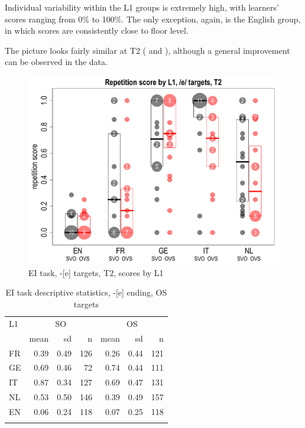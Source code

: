 Individual variability within the L1 groups is extremely high, with learners’ scores ranging from 0\% to 100\%. The only exception, again, is the English group, in which scores are consistently close to floor level.

The picture looks fairly similar at T2 ( and ), although a general improvement can be observed in the data. 

\begin{figure}
    \includegraphics[width=\textwidth]{figures/04-2.pdf}
    \caption{EI task, -[e] targets, T2, scores by L1}
    \label{fig:04:2}
\end{figure}

\begin{table}
    \begin{tabular}{lrrr rrr}
    \lsptoprule
    L1 & \multicolumn{3}{c}{ SO} & \multicolumn{3}{c}{ OS}\\
    & mean & sd & n & mean & sd & n\\
    \cmidrule(r){2-4}\cmidrule(l){5-7}
    FR & 0.39 & 0.49 & 126 & 0.26 & 0.44 & 121\\
    GE & 0.69 & 0.46 & 72 & 0.74 & 0.44 & 111\\
    IT & 0.87 & 0.34 & 127 & 0.69 & 0.47 & 131\\
    NL & 0.53 & 0.50 & 146 & 0.39 & 0.49 & 157\\
    EN & 0.06 & 0.24 & 118 & 0.07 & 0.25 & 118\\
    \lspbottomrule
    \end{tabular}
    \caption{EI task descriptive statistics, -[e] ending, OS targets}
    \label{tab:04:2}
    \label{tab:03:2}
\end{table}

